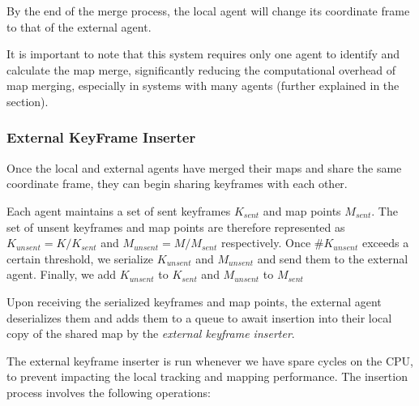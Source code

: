 By the end of the merge process, the local agent will change its coordinate frame to that of the external agent.

It is important to note that this system requires only one agent to identify and calculate the map merge, significantly reducing the computational overhead of map merging, especially in systems with many agents (further explained in the  section).

\subsubsection{External KeyFrame Inserter}
\label{sec:external-key-frame-inserter}
Once the local and external agents have merged their maps and share the same coordinate frame, they can begin sharing keyframes with each other.

Each agent maintains a set of sent keyframes $K_{sent}$ and map points $M_{sent}$. The set of unsent keyframes and map points are therefore represented as $K_{unsent} = K / K_{sent}$ and $M_{unsent} = M / M_{sent}$ respectively. Once $\#K_{unsent}$ exceeds a certain threshold, we serialize $K_{unsent}$ and $M_{unsent}$ and send them to the external agent. Finally, we add $K_{unsent}$ to $K_{sent}$ and $M_{unsent}$ to $M_{sent}$

Upon receiving the serialized keyframes and map points, the external agent deserializes them and adds them to a queue to await insertion into their local copy of the shared map by the \textit{external keyframe inserter}.

The external keyframe inserter is run whenever we have spare cycles on the CPU, to prevent impacting the local tracking and mapping performance. The insertion process involves the following operations:

